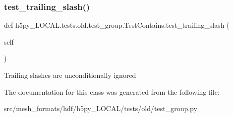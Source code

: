 \subsubsection{\texorpdfstring{test\+\_\+trailing\+\_\+slash()}{test\_trailing\_slash()}}
{\footnotesize\ttfamily def h5py\+\_\+\+L\+O\+C\+A\+L.\+tests.\+old.\+test\+\_\+group.\+Test\+Contains.\+test\+\_\+trailing\+\_\+slash (\begin{DoxyParamCaption}\item[{}]{self }\end{DoxyParamCaption})}

\begin{DoxyVerb}Trailing slashes are unconditionally ignored \end{DoxyVerb}
 

The documentation for this class was generated from the following file\+:\begin{DoxyCompactItemize}
\item 
src/mesh\+\_\+formats/hdf/h5py\+\_\+\+L\+O\+C\+A\+L/tests/old/test\+\_\+group.\+py\end{DoxyCompactItemize}
